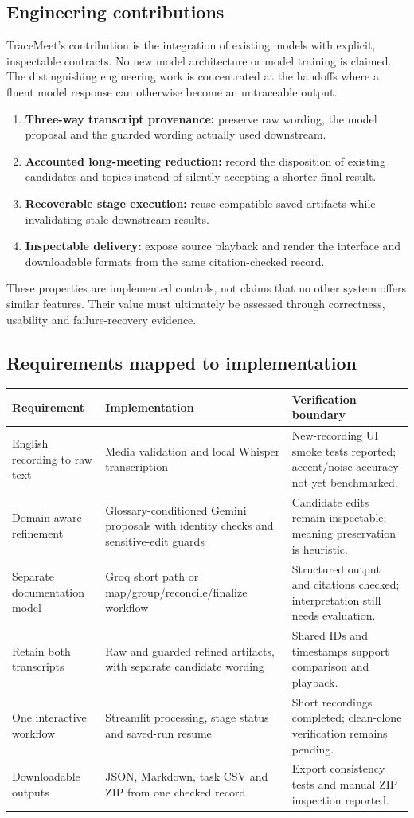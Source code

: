 \documentclass[11pt,a4paper]{article}
\begin{document}
\subsection{Engineering contributions}
TraceMeet's contribution is the integration of existing models with explicit, inspectable contracts. No new model architecture or model training is claimed. The distinguishing engineering work is concentrated at the handoffs where a fluent model response can otherwise become an untraceable output.
\begin{enumerate}
\item \textbf{Three-way transcript provenance:} preserve raw wording, the model proposal and the guarded wording actually used downstream.
\item \textbf{Accounted long-meeting reduction:} record the disposition of existing candidates and topics instead of silently accepting a shorter final result.
\item \textbf{Recoverable stage execution:} reuse compatible saved artifacts while invalidating stale downstream results.
\item \textbf{Inspectable delivery:} expose source playback and render the interface and downloadable formats from the same citation-checked record.
\end{enumerate}
These properties are implemented controls, not claims that no other system offers similar features. Their value must ultimately be assessed through correctness, usability and failure-recovery evidence.

\subsection{Requirements mapped to implementation}
\begin{tabularx}{\textwidth}{@{}p{}YY@{}}\toprule
Requirement & Implementation & Verification boundary\\\midrule
English recording to raw text & Media validation and local Whisper transcription & New-recording UI smoke tests reported; accent/noise accuracy not yet benchmarked.\\
Domain-aware refinement & Glossary-conditioned Gemini proposals with identity checks and sensitive-edit guards & Candidate edits remain inspectable; meaning preservation is heuristic.\\
Separate documentation model & Groq short path or map/group/reconcile/finalize workflow & Structured output and citations checked; interpretation still needs evaluation.\\
Retain both transcripts & Raw and guarded refined artifacts, with separate candidate wording & Shared IDs and timestamps support comparison and playback.\\
One interactive workflow & Streamlit processing, stage status and saved-run resume & Short recordings completed; clean-clone verification remains pending.\\
Downloadable outputs & JSON, Markdown, task CSV and ZIP from one checked record & Export consistency tests and manual ZIP inspection reported.\\\bottomrule
\end{tabularx}
\end{document}
